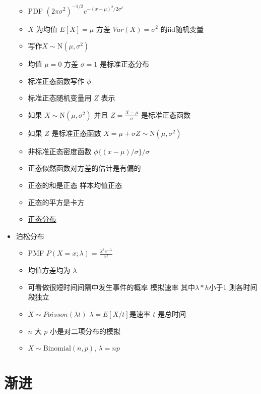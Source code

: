 \documentclass[]{book}
\providecommand{\tightlist}{%
  \setlength{\itemsep}{0pt}\setlength{\parskip}{0pt}}
\begin{document}
\begin{itemize}
  \begin{itemize}
  \tightlist
  \item
    PDF \((2\pi \sigma^2)^{-1/2}e^{-(x - \mu)^2/2\sigma^2}\)
  \item
    \(X\) 为均值 \(E[X] = \mu\) 方差 \(Var(X) = \sigma^2\) 的iid随机变量
  \item
    写作\(X\sim \mbox{N}(\mu, \sigma^2)\)
  \item
    均值 \(\mu = 0\) 方差 \(\sigma = 1\) 是标准正态分布
  \item
    标准正态函数写作 \(\phi\)
  \item
    标准正态随机变量用 \(Z\) 表示
  \item
    如果 \(X \sim \mbox{N}(\mu,\sigma^2)\) 并且 \(Z = \frac{X -\mu}{\sigma}\) 是标准正态函数
  \item
    如果 \(Z\) 是标准正态函数 \(X = \mu + \sigma Z \sim \mbox{N}(\mu, \sigma^2)\)
  \item
    非标准正态密度函数 \(\phi\{(x - \mu) / \sigma\}/\sigma\)
  \item
    正态似然函数对方差的估计是有偏的
  \item
    正态的和是正态 样本均值正态
  \item
    正态的平方是卡方
  \item
    \href{http://songshuhui.net/archives/76501}{正态分布}
  \end{itemize}
\item
  泊松分布

  \begin{itemize}
  \tightlist
  \item
    PMF \(P(X = x; \lambda) = \frac{\lambda^x e^{-\lambda}}{x!}\)
  \item
    均值方差均为 \(\lambda\)
  \item
    可看做很短时间间隔中发生事件的概率 模拟速率 其中\(\lambda * h\)小于1 则各时间段独立
  \item
    \(X \sim Poisson(\lambda t)\) \(\lambda = E[X / t]\)是速率 \(t\) 是总时间
  \item
    \(n\) 大 \(p\) 小是对二项分布的模拟
  \item
    \(X \sim \mbox{Binomial}(n, p)\), \(\lambda = n p\)
  \end{itemize}
\end{itemize}

\section{渐进}
\end{document}
